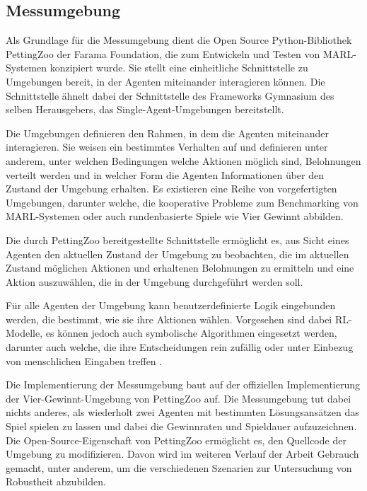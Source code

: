 \subsection{Messumgebung}

\label{messumgebung}


Als Grundlage für die Messumgebung dient die Open Source Python-Bibliothek PettingZoo der Farama Foundation, die zum Entwickeln und Testen von MARL-Systemen konzipiert wurde. Sie stellt eine einheitliche Schnittstelle zu Umgebungen bereit, in der Agenten miteinander interagieren können. Die Schnittstelle ähnelt dabei der Schnittstelle des Frameworks Gymnasium des selben Herausgebers, das Single-Agent-Umgebungen bereitstellt.

Die Umgebungen definieren den Rahmen, in dem die Agenten miteinander interagieren. Sie weisen ein bestimmtes Verhalten auf und definieren unter anderem, unter welchen Bedingungen welche Aktionen möglich sind, Belohnungen verteilt werden und in welcher Form die Agenten Informationen über den Zustand der Umgebung erhalten. Es existieren eine Reihe von vorgefertigten Umgebungen, darunter welche, die kooperative Probleme zum Benchmarking von MARL-Systemen oder auch rundenbasierte Spiele wie Vier Gewinnt abbilden.

Die durch PettingZoo bereitgestellte Schnittstelle ermöglicht es, aus Sicht eines Agenten den aktuellen Zustand der Umgebung zu beobachten, die im aktuellen Zustand möglichen Aktionen und erhaltenen Belohnungen zu ermitteln und eine Aktion auszuwählen, die in der Umgebung durchgeführt werden soll.

Für alle Agenten der Umgebung kann benutzerdefinierte Logik eingebunden werden, die bestimmt, wie sie ihre Aktionen wählen. Vorgesehen sind dabei RL-Modelle, es können jedoch auch symbolische Algorithmen eingesetzt werden, darunter auch welche, die ihre Entscheidungen rein zufällig oder unter Einbezug von menschlichen Eingaben treffen \cite{Farama.2025}.


Die Implementierung der Messumgebung baut auf der offiziellen Implementierung der Vier-Gewinnt-Umgebung von PettingZoo auf. Die Messumgebung tut dabei nichts anderes, als wiederholt zwei Agenten mit bestimmten Lösungsansätzen das Spiel spielen zu lassen und dabei die Gewinnraten und Spieldauer aufzuzeichnen. Die Open-Source-Eigenschaft von PettingZoo ermöglicht es, den Quellcode der Umgebung zu modifizieren. Davon wird im weiteren Verlauf der Arbeit Gebrauch gemacht, unter anderem, um die verschiedenen Szenarien zur Untersuchung von Robustheit abzubilden.


